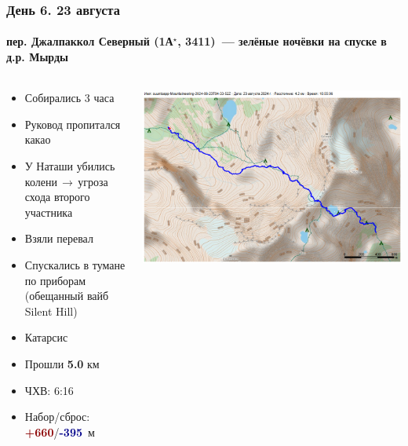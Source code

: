 	\begin{frame}
	\frametitle{День 6. 23 августа}
	\framesubtitle{\textbf{пер. Джалпаккол Северный (1А$^\star$, 3411)}~--- зелёные ночёвки на спуске в д.р. Мырды} %
	\begin{columns}[c] %
		\begin{column}{0.55\textwidth} %
			\begin{itemize}
				\item Собирались 3 часа
				\item Руковод пропитался какао
				\item У Наташи убились колени$\,\to\,$угроза схода второго участника
				\item Взяли перевал
				\item Спускались в тумане по приборам (обещанный вайб Silent Hill)
				\item Катарсис
				\item Прошли \textbf{5.0} км
				\item ЧХВ: 6:16
				\item Набор/сброс: \textcolor{darkred}{\textbf{+660}}/\textcolor{darkblue}{\textbf{-395}}~м
			\end{itemize}
			
		\end{column}
		\begin{column}{0.45\textwidth} %
			\centering
			\includegraphics[width=\linewidth]{../pics/mini_maps/23}
		\end{column}
	\end{columns}
\end{frame}

